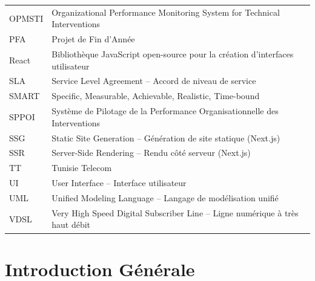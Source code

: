 \documentclass[10pt,a4paper]{report}
\begin{document}
\begin{longtable}{L{3cm} L{11.5cm}}
OPMSTI    & Organizational Performance Monitoring System for Technical Interventions \\
PFA       & Projet de Fin d'Année \\
React     & Bibliothèque JavaScript open-source pour la création d'interfaces utilisateur \\
SLA       & Service Level Agreement -- Accord de niveau de service \\
SMART     & Specific, Measurable, Achievable, Realistic, Time-bound \\
SPPOI     & Système de Pilotage de la Performance Organisationnelle des Interventions \\
SSG       & Static Site Generation -- Génération de site statique (Next.js) \\
SSR       & Server-Side Rendering -- Rendu côté serveur (Next.js) \\
TT        & Tunisie Telecom \\
UI        & User Interface -- Interface utilisateur \\
UML       & Unified Modeling Language -- Langage de modélisation unifié \\
VDSL      & Very High Speed Digital Subscriber Line -- Ligne numérique à très haut débit \\
\end{longtable}

{}
\tableofcontents

\clearpage
{}
{}
\listoffigures

\clearpage
{}
{}
\listoftables

\clearpage

\chapter*{Introduction Générale}
\thispagestyle{fancy}
\end{document}
